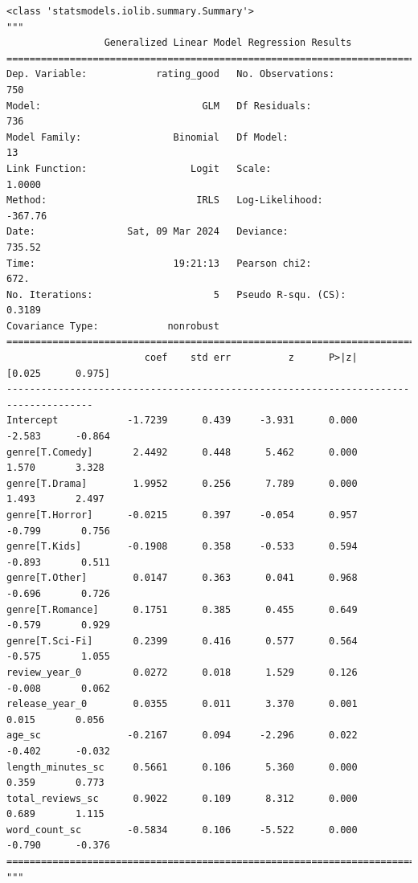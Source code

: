 \documentclass[
  letterpaper,
]{krantz}
\begin{document}
\begin{verbatim}
<class 'statsmodels.iolib.summary.Summary'>
"""
                 Generalized Linear Model Regression Results                  
==============================================================================
Dep. Variable:            rating_good   No. Observations:                  750
Model:                            GLM   Df Residuals:                      736
Model Family:                Binomial   Df Model:                           13
Link Function:                  Logit   Scale:                          1.0000
Method:                          IRLS   Log-Likelihood:                -367.76
Date:                Sat, 09 Mar 2024   Deviance:                       735.52
Time:                        19:21:13   Pearson chi2:                     672.
No. Iterations:                     5   Pseudo R-squ. (CS):             0.3189
Covariance Type:            nonrobust                                         
=====================================================================================
                        coef    std err          z      P>|z|      [0.025      0.975]
-------------------------------------------------------------------------------------
Intercept            -1.7239      0.439     -3.931      0.000      -2.583      -0.864
genre[T.Comedy]       2.4492      0.448      5.462      0.000       1.570       3.328
genre[T.Drama]        1.9952      0.256      7.789      0.000       1.493       2.497
genre[T.Horror]      -0.0215      0.397     -0.054      0.957      -0.799       0.756
genre[T.Kids]        -0.1908      0.358     -0.533      0.594      -0.893       0.511
genre[T.Other]        0.0147      0.363      0.041      0.968      -0.696       0.726
genre[T.Romance]      0.1751      0.385      0.455      0.649      -0.579       0.929
genre[T.Sci-Fi]       0.2399      0.416      0.577      0.564      -0.575       1.055
review_year_0         0.0272      0.018      1.529      0.126      -0.008       0.062
release_year_0        0.0355      0.011      3.370      0.001       0.015       0.056
age_sc               -0.2167      0.094     -2.296      0.022      -0.402      -0.032
length_minutes_sc     0.5661      0.106      5.360      0.000       0.359       0.773
total_reviews_sc      0.9022      0.109      8.312      0.000       0.689       1.115
word_count_sc        -0.5834      0.106     -5.522      0.000      -0.790      -0.376
=====================================================================================
"""
\end{verbatim}
\end{document}
